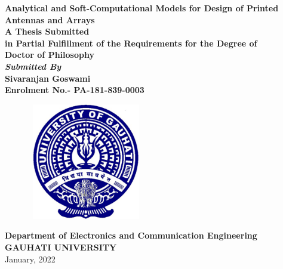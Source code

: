 \begin{titlepage}
\begin{center}
{\Large \bf Analytical and Soft-Computational Models for Design of Printed Antennas and Arrays} \\ [5ex]


{\normalsize{ \textbf{A Thesis Submitted \\in
 Partial Fulfillment of the Requirements for the Degree of \\\large \bf
Doctor of
Philosophy}}}\\
[8ex] {\sl \textbf{Submitted By}} \\[2ex]
{\sf \sf \textbf{Sivaranjan Goswami\\
Enrolment No.- PA-181-839-0003}}\\[10ex]
\begin{figure}[h]
    \centering
\includegraphics[width=2.0in,height=2.0in]{clogoe.eps}\\
\end{figure}
\vspace{2in}
{\large \bf Department of Electronics and Communication Engineering}  \\[1ex]
{\large \bf{GAUHATI UNIVERSITY}} \\[1ex]
{\normalsize January, 2022 }
\end{center}
\end{titlepage}
